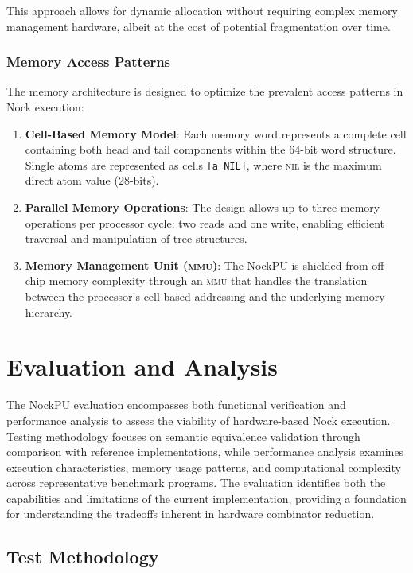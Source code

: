\documentclass[twoside]{article}
\begin{document}
This approach allows for dynamic allocation without requiring complex memory management hardware, albeit at the cost of potential fragmentation over time.

\subsubsection{Memory Access Patterns}

The memory architecture is designed to optimize the prevalent access patterns in Nock execution:

\begin{enumerate}
  \item \textbf{Cell-Based Memory Model}: Each memory word represents a complete cell containing both head and tail components within the 64-bit word structure. Single atoms are represented as cells \texttt{[a NIL]}, where \textsc{nil} is the maximum direct atom value (28-bits).
  \item \textbf{Parallel Memory Operations}: The design allows up to three memory operations per processor cycle: two reads and one write, enabling efficient traversal and manipulation of tree structures.
  \item \textbf{Memory Management Unit (\textsc{mmu})}: The NockPU is shielded from off-chip memory complexity through an \textsc{mmu} that handles the translation between the processor's cell-based addressing and the underlying memory hierarchy.
\end{enumerate}

\section{Evaluation and Analysis}

The NockPU evaluation encompasses both functional verification and performance analysis to assess the viability of hardware-based Nock execution. Testing methodology focuses on semantic equivalence validation through comparison with reference implementations, while performance analysis examines execution characteristics, memory usage patterns, and computational complexity across representative benchmark programs. The evaluation identifies both the capabilities and limitations of the current implementation, providing a foundation for understanding the tradeoffs inherent in hardware combinator reduction.

\subsection{Test Methodology}
\end{document}
